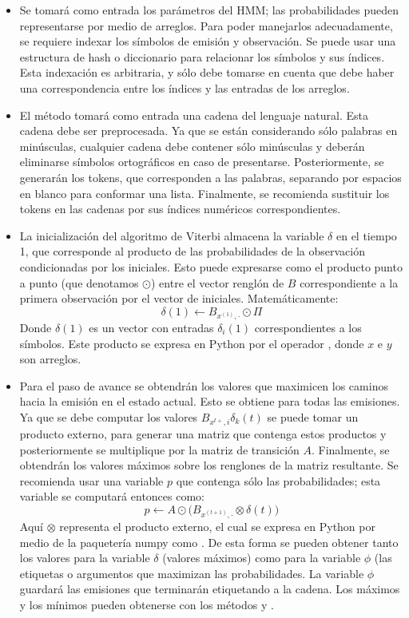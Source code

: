 \begin{itemize}
    \item Se tomará como entrada los parámetros del HMM; las probabilidades pueden representarse por medio de arreglos. Para poder manejarlos adecuadamente, se requiere indexar los símbolos de emisión y observación. Se puede usar una estructura de hash o diccionario para relacionar los símbolos y sus índices. Esta indexación es arbitraria, y sólo debe tomarse en cuenta que debe haber una correspondencia entre los índices y las entradas de los arreglos. 

    \item El método tomará como entrada una cadena del lenguaje natural. Esta cadena debe ser preprocesada. Ya que se están considerando sólo palabras en minúsculas, cualquier cadena debe contener sólo minúsculas y deberán eliminarse símbolos ortográficos en caso de presentarse. Posteriormente, se generarán los tokens, que corresponden a las palabras, separando por espacios en blanco para conformar una lista. Finalmente, se recomienda sustituir los tokens en las cadenas por sus índices numéricos correspondientes.

    \item La inicialización del algoritmo de Viterbi almacena la variable $\delta$ en el tiempo 1, que corresponde al producto de las probabilidades de la observación condicionadas por los iniciales. Esto puede expresarse como el producto punto a punto (que denotamos $\odot$) entre el vector renglón de $B$ correspondiente a la primera observación por el vector de iniciales. Matemáticamente:
    $$\delta(1) \leftarrow B_{x^{(1)}, \cdot} \odot \Pi$$
    Donde $\delta(1)$ es un vector con entradas $\delta_i(1)$ correspondientes a los símbolos. Este producto se expresa en Python por el operador , donde $x$ e $y$ son arreglos.

    \item Para el paso de avance se obtendrán los valores que maximicen los caminos hacia la emisión en el estado actual. Esto se obtiene para todas las emisiones. Ya que se debe computar los valores $B_{x^{t+}, i} \delta_k(t)$ se puede tomar un producto externo, para generar una matriz que contenga estos productos y posteriormente se multiplique por la matriz de transición $A$. Finalmente, se obtendrán los valores máximos sobre los renglones de la matriz resultante. Se recomienda usar una variable $p$ que contenga sólo las probabilidades; esta variable se computará entonces como:
    $$p\leftarrow A \odot \Big( B_{x^{(t+1)}, \cdot} \otimes \delta(t) \Big)$$
    Aquí $\otimes$ representa el producto externo, el cual se expresa en Python por medio de la paquetería numpy como .  De esta forma se pueden obtener tanto los valores para la variable $\delta$ (valores máximos) como para la variable $\phi$ (las etiquetas o argumentos que maximizan las probabilidades. La variable $\phi$ guardará las emisiones que terminarán etiquetando a la cadena. Los máximos y los mínimos pueden obtenerse con los métodos  y .


\end{itemize}
